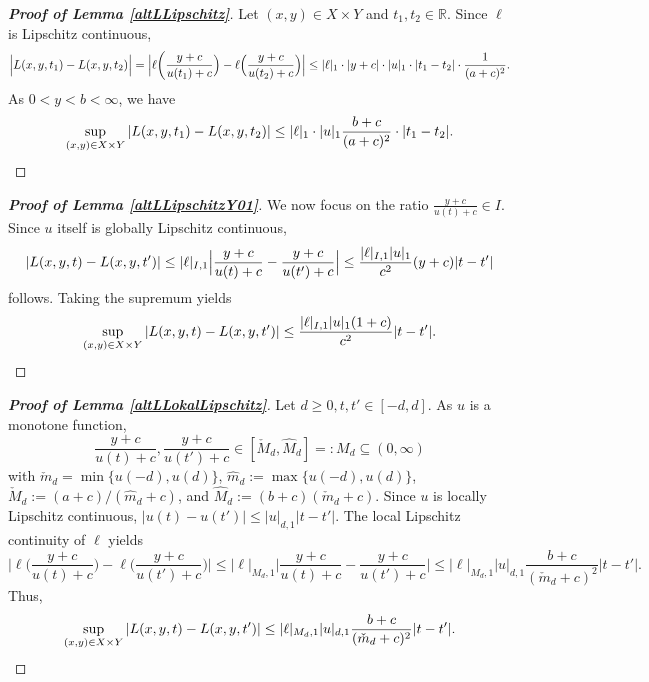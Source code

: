 \documentclass[10pt]{article}
\newcommand{\R}{\mathbb{R}}
\newcommand{\XY}{X \times Y}
\begin{document}
\begin{proof}[\upshape\bfseries Proof of Lemma \ref{altLLipschitz}]
	Let $(x,y) \in \XY$ and $t_1, t_2 \in \R$.
	Since $\ell$ is Lipschitz continuous,
	\begin{equation*}
		\Bigl|L(x, y, t_1) - L(x, y, t_2)\Bigr| = \Bigl| \ell\biggl( \frac{y + c}{u(t_1) + c}\Bigr) -  \ell\Bigl( \frac{y + c}{u(t_2) + c}\Bigr)\Bigr| \leq |\ell|_1 \cdot |y + c|\cdot |u|_1 \cdot |t_1 - t_2| \cdot \frac{1}{(a+c)^2}.
	\end{equation*}
	As $0 < y < b < \infty$, we have
	\begin{equation*}
		\sup_{(x,y) \in X \times Y} |L(x, y, t_1) - L(x, y, t_2)| \leq |\ell|_1 \cdot |u|_1 \frac{b + c}{(a+c)^2} \cdot |t_1 - t_2|. \qedhere
	\end{equation*}
\end{proof}
\begin{proof}[\upshape\bfseries Proof of Lemma \ref{altLLipschitzY01}]
	We now focus on the ratio $\frac{y+c}{u(t)+c} \in I$.
	Since $u$ itself is globally Lipschitz continuous,
	\begin{equation*}
		|L(x,y,t)-L(x,y,t')| \leq |\ell|_{I,1} \Bigl| \frac{y+c}{u(t)+c} - \frac{y+c}{u(t')+c} \Bigr| \leq \frac{|\ell|_{I,1} |u|_1}{c^2} (y+c)|t-t'|
	\end{equation*}
	follows. Taking the supremum yields
	\begin{equation*}
		\sup_{(x,y) \in \XY} |L(x,y,t)-L(x,y,t')| \leq \frac{|\ell|_{I,1} |u|_1 (1+c)}{c^2}|t-t'|. \qedhere
	\end{equation*}
\end{proof}
\begin{proof}[\upshape\bfseries Proof of Lemma \ref{altLLokalLipschitz}]
	Let $d \geq 0, t, t' \in [-d,d]$.
	As $u$ is a monotone function,
	\begin{equation*}
		\frac{y+c}{u(t)+c}, \frac{y+c}{u(t')+c} \in [\check{M}_d, \hat{M}_d] =: M_d \subseteq (0, \infty)
	\end{equation*}
	with $\check{m}_d = \min\{u(-d), u(d)\}$, 
	$\hat{m}_d := \max\{u(-d), u(d)\}$, 
	$\check{M}_d := (a+c)/(\hat{m}_d+c)$,
	and
	$\hat{M}_d := (b + c)(\check{m}_d + c)$.
	Since $u$ is locally Lipschitz continuous, $|u(t)-u(t')| \leq |u|_{d,1} |t - t'|$.
	The local Lipschitz continuity of $\ell$ yields
	\begin{equation*}
		\biggl|\ell\biggl(\frac{y+c}{u(t)+c}\biggr)-\ell\biggl(\frac{y+c}{u(t')+c}\biggr)\biggr| \leq |\ell|_{M_d, 1} \biggl|\frac{y+c}{u(t)+c}-\frac{y+c}{u(t')+c}\biggr| \leq |\ell|_{M_d,1} |u|_{d,1} \frac{b+c}{(\check{m}_d+c)^2} |t-t'|.
	\end{equation*}
	Thus,
	\begin{equation*}
		\sup_{(x,y) \in \XY} |L(x,y,t)-L(x,y,t')| \leq|\ell|_{M_d,1} |u|_{d,1} \frac{b+c}{(\check{m}_d+c)^2} |t-t'|. \qedhere
	\end{equation*}
\end{proof}
	
\end{document}
